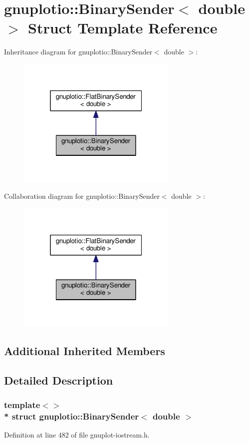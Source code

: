 \hypertarget{structgnuplotio_1_1_binary_sender_3_01double_01_4}{}\section{gnuplotio\+:\+:Binary\+Sender$<$ double $>$ Struct Template Reference}
\label{structgnuplotio_1_1_binary_sender_3_01double_01_4}


Inheritance diagram for gnuplotio\+:\+:Binary\+Sender$<$ double $>$\+:\nopagebreak
\begin{figure}[H]
\begin{center}
\leavevmode
\includegraphics[width=217pt]{structgnuplotio_1_1_binary_sender_3_01double_01_4__inherit__graph}
\end{center}
\end{figure}


Collaboration diagram for gnuplotio\+:\+:Binary\+Sender$<$ double $>$\+:\nopagebreak
\begin{figure}[H]
\begin{center}
\leavevmode
\includegraphics[width=217pt]{structgnuplotio_1_1_binary_sender_3_01double_01_4__coll__graph}
\end{center}
\end{figure}
\subsection*{Additional Inherited Members}


\subsection{Detailed Description}
\subsubsection*{template$<$$>$\\*
struct gnuplotio\+::\+Binary\+Sender$<$ double $>$}



Definition at line 482 of file gnuplot-\/iostream.\+h.


